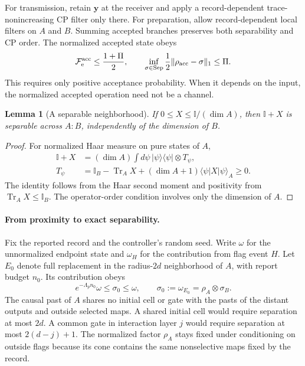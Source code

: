 \documentclass[aps,prl,twocolumn,superscriptaddress,longbibliography,reprint,floatfix]{revtex4-2}
\newcommand{\ket}[1]{\lvert #1\rangle}
\newcommand{\bra}[1]{\langle #1\rvert}
\newcommand{\tr}{\operatorname{Tr}}
\newcommand{\Id}{\mathbb I}
\newcommand{\Fe}{\mathcal F_{\mathrm e}}
\newtheorem{lemma}{Lemma}
\begin{document}
For transmission, retain $\boldsymbol y$ at the receiver and apply a
record-dependent trace-nonincreasing CP filter only there. For
preparation, allow record-dependent local filters on $A$ and $B$.
Summing accepted branches preserves both separability and CP order.
The normalized accepted state obeys
\begin{equation}
 \Fe^{\rm acc}\le\frac{1+\Pi}{2},\qquad
 \inf_{\sigma\in{\rm Sep}}\frac12
       \|\rho_{\rm acc}-\sigma\|_1\le\Pi .
 \label{eq:uniform-herald}
\end{equation}
This requires only positive acceptance probability. When it depends
on the input, the normalized accepted operation need not be a channel.


\begin{lemma}[A separable neighborhood]
\label{lem:one-sided-separable}
If $0\le X\le\Id/(\dim A)$, then
$\Id+X$ is separable across $A:B$, independently of the dimension of $B$.
\end{lemma}
\begin{proof}
For normalized Haar measure on pure states of $A$,
\begin{equation}
 \begin{aligned}
 \Id+X&=(\dim A)\int d\psi\,\ket\psi\bra\psi\otimes T_\psi,\\
 T_\psi&=\Id_B-\tr_A X
              +(\dim A+1)\langle\psi|X|\psi\rangle_A\ge0 .
 \end{aligned}
 \label{eq:strict-ball}
\end{equation}
The identity follows from the Haar second moment and positivity
from $\tr_A X\le\Id_B$. The operator-order condition involves only the dimension of $A$.
\end{proof}

\smallskip
\paragraph*{From proximity to exact separability.}
Fix the reported record and the controller's random seed. Write $\omega$
for the unnormalized endpoint state and $\omega_H$ for the contribution
from flag event $H$. Let $E_0$ denote full replacement in the radius-$2d$
neighborhood of $A$, with report budget $n_0$. Its contribution obeys
\begin{equation}
 e^{-\Lambda_p n_0}\omega\le\sigma_0\le\omega,\qquad
 \sigma_0:=\omega_{E_0}=\rho_A\otimes\sigma_B .
 \label{eq:strict-anchor}
\end{equation}
The causal past of $A$ shares no initial cell or gate with the pasts
of the distant outputs and outside selected maps. A shared initial cell
would require separation at most $2d$. A common gate in interaction layer
$j$ would require separation at most $2(d-j)+1$. The normalized factor
$\rho_A$ stays fixed under conditioning on outside flags because its cone
contains the same nonselective maps fixed by the record.
\end{document}
